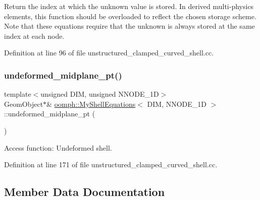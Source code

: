 Return the index at which the unknown value is stored. In derived multi-\/physics elements, this function should be overloaded to reflect the chosen storage scheme. Note that these equations require that the unknown is always stored at the same index at each node. 



Definition at line 96 of file unstructured\+\_\+clamped\+\_\+curved\+\_\+shell.\+cc.

\mbox{\label{classoomph_1_1MyShellEquations_acf40f3e2413d4640be3ba3664b8d0426}} 
\subsubsection{\texorpdfstring{undeformed\+\_\+midplane\+\_\+pt()}{undeformed\_midplane\_pt()}}
{\footnotesize\ttfamily template$<$unsigned D\+IM, unsigned N\+N\+O\+D\+E\+\_\+1D$>$ \\
Geom\+Object$\ast$\& \hyperlink{classoomph_1_1MyShellEquations}{oomph\+::\+My\+Shell\+Equations}$<$ D\+IM, N\+N\+O\+D\+E\+\_\+1D $>$\+::undeformed\+\_\+midplane\+\_\+pt (\begin{DoxyParamCaption}{ }\end{DoxyParamCaption})\hspace{0.3cm}{\ttfamily [inline]}}



Access function\+: Undeformed shell. 



Definition at line 171 of file unstructured\+\_\+clamped\+\_\+curved\+\_\+shell.\+cc.



\subsection{Member Data Documentation}
\mbox{\label{classoomph_1_1MyShellEquations_a6cd7175e7205dc7cea4e0e505f3cb8b9}} 
